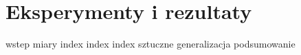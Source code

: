 \chapter{Eksperymenty i rezultaty}

{wstep}
{miary}
{index}
{index}
\newpage
{index}
\newpage
{sztuczne}
{generalizacja}
{podsumowanie}
